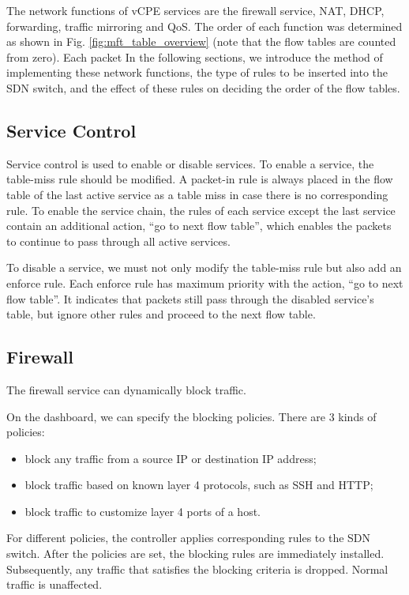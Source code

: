 \documentclass[conference]{IEEEtran}
\begin{document}
The network functions of vCPE services are the firewall service, NAT, DHCP, forwarding, traffic mirroring and QoS. The order of each function was determined as shown in Fig. \ref{fig:mft_table_overview} (note that the flow tables are counted from zero). Each packet In the following sections, we introduce the method of implementing these network functions, the type of rules to be inserted into the SDN switch, and the effect of these rules on deciding the order of the flow tables.

\subsection{Service Control}
Service control is used to enable or disable services. To enable a service, the table-miss rule should be modified. A packet-in rule is always placed in the flow table of the last active service as a table miss in case there is no corresponding rule. To enable the service chain, the rules of each service except the last service contain an additional action, ``go to next flow table'', which enables the packets to continue to pass through all active services.

To disable a service, we must not only modify the table-miss rule but also add an enforce rule. Each enforce rule has maximum priority with the action, ``go to next flow table''. It indicates that packets still pass through the disabled service’s table, but ignore other rules and proceed to the next flow table.

\subsection{Firewall}
The firewall service can dynamically block traffic.

On the dashboard, we can specify the blocking policies. There are 3 kinds of policies:
\begin{itemize}[]
\item block any traffic from a source IP or destination IP address;
\item block traffic based on known layer 4 protocols, such as SSH and HTTP;
\item block traffic to customize layer 4 ports of a host.
\end{itemize}

For different policies, the controller applies corresponding rules to the SDN switch.
After the policies are set, the blocking rules are immediately installed.
Subsequently, any traffic that satisfies the blocking criteria is dropped.
Normal traffic is unaffected.
\end{document}
